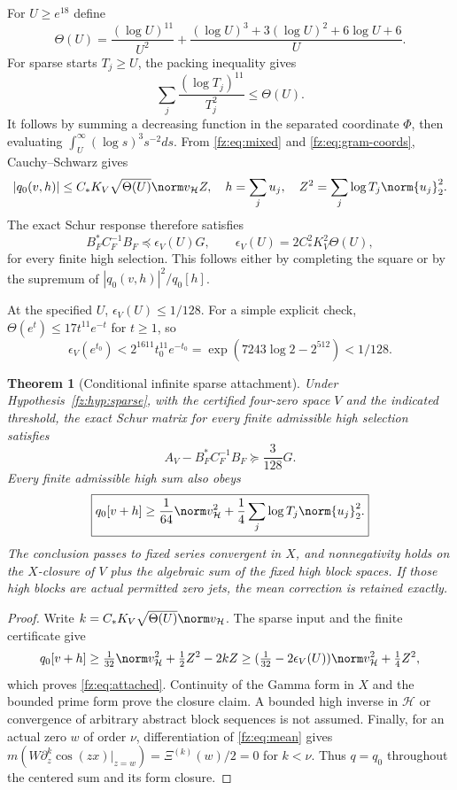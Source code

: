 \documentclass[11pt,a4paper]{article}
\numberwithin{equation}{section}
\newtheorem{theorem}{Theorem}[section]
\theoremstyle{definition}\newtheorem{definition}[theorem]{Definition}
\theoremstyle{remark}\newtheorem{remark}[theorem]{Remark}
\newcommand{\Hh}{\mathcal H}\newcommand{\Hw}{\mathcal H}
\begin{document}
For $U\ge e^{18}$ define
\[
 \Theta(U)=\frac{(\log U)^{11}}{U^2}+
 \frac{(\log U)^3+3(\log U)^2+6\log U+6}{U}.
\]
For sparse starts $T_j\ge U$, the packing inequality gives
\[
 \sum_j\frac{(\log T_j)^{11}}{T_j^2}\le\Theta(U).
\]
It follows by summing a decreasing function in the separated coordinate
$\Phi$, then evaluating $\int_U^\infty (\log s)^3s^{-2}ds$.
From \eqref{fz:eq:mixed} and \eqref{fz:eq:gram-coords}, Cauchy--Schwarz gives
\[
 |q_0(v,h)|\le C_*K_V\sqrt{\Theta(U)}\norm v_{\Hh}Z,
 \quad h=\sum_j u_j,\quad Z^2=\sum_j\log T_j\norm{u_j}_2^2.
\]
The exact Schur response therefore satisfies
\begin{equation}\label{fz:eq:response}
 B_F^*C_F^{-1}B_F\preceq\epsilon_V(U)G,
 \qquad \epsilon_V(U)=2C_*^2K_V^2\Theta(U),
\end{equation}
for every finite high selection. This follows either by completing the
square or by the supremum of $|q_0(v,h)|^2/q_0[h]$.

At the specified $U$, $\epsilon_V(U)\le1/128$. For a simple explicit
check, $\Theta(e^t)\le17t^{11}e^{-t}$ for $t\ge1$, so
\[
 \epsilon_V(e^{t_0})<2^{1611}t_0^{11}e^{-t_0}
 =\exp(7243\log2-2^{512})<1/128.
\]

\begin{theorem}[Conditional infinite sparse attachment]\label{fz:thm:attachment}
Under Hypothesis~\ref{fz:hyp:sparse}, with the certified four-zero space $V$
and the indicated threshold, the exact Schur matrix for every finite
admissible high selection satisfies
\[
 A_V-B_F^*C_F^{-1}B_F\succeq\frac3{128}G.
\]
Every finite admissible high sum also obeys
\begin{equation}\label{fz:eq:attached}
 \boxed{q_0[v+h]\ge\frac1{64}\norm v_{\Hh}^2
                  +\frac14\sum_j\log T_j\norm{u_j}_2^2.}
\end{equation}
The conclusion passes to fixed series convergent in $X$, and
nonnegativity holds on the $X$-closure of $V$ plus the algebraic sum of
the fixed high block spaces. If those high blocks are actual permitted
zero jets, the mean correction is retained exactly.
\end{theorem}
\begin{proof}
Write $k=C_*K_V\sqrt{\Theta(U)}\norm v_{\Hh}$. The sparse input and
the finite certificate give
\[
 q_0[v+h]\ge\tfrac1{32}\norm v_{\Hh}^2+\tfrac12 Z^2-2kZ
 \ge(\tfrac1{32}-2\epsilon_V(U))\norm v_{\Hh}^2+\tfrac14Z^2,
\]
which proves \eqref{fz:eq:attached}. Continuity of the Gamma form in $X$
and the bounded prime form prove the closure claim. A bounded high inverse
in $\Hh$ or convergence of arbitrary abstract block sequences is not assumed.
Finally, for an actual zero $w$ of order $\nu$, differentiation of
\eqref{fz:eq:mean} gives
$m(W\partial_z^k\cos(zx)|_{z=w})=\Xi^{(k)}(w)/2=0$ for $k<\nu$.
Thus $q=q_0$ throughout the centered sum and its form closure.
\end{proof}
\end{document}
